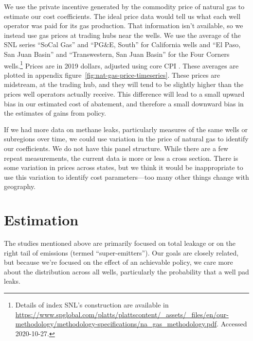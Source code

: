 \documentclass[12pt,oneside,letterpaper]{article}
\theoremstyle{definition}
\begin{document}
\begin{refsection}
We use the private incentive generated by the commodity price of natural gas to estimate our cost coefficients.
The ideal price data would tell us what each well operator was paid for its gas production.
That information isn't available, so we instead use gas prices at trading hubs near the wells.
We use the average of the \gls{SNL} series ``SoCal Gas'' and ``PG\&E, South'' for California wells and
``El Paso, San Juan Basin'' and ``Transwestern, San Juan Basin'' for the Four Corners wells.\footnote{%
Details of index SNL's construction are available in \url{https://www.spglobal.com/platts/plattscontent/_assets/_files/en/our-methodology/methodology-specifications/na_gas_methodology.pdf}.
Accessed 2020-10-27.}
Prices are in 2019 dollars, adjusted using core CPI \parencite{fred_cpi}.
These averages are plotted in appendix figure~\ref{fig:nat-gas-price-timeseries}.
These prices are midstream, at the trading hub, and they will tend to be slightly higher than the prices well operators actually receive.
This difference will lead to a small upward bias in our estimated cost of abatement, and therefore a small downward bias in the estimates of gains from policy.

If we had more data on methane leaks, particularly measures of the same wells or subregions over time, we could use variation in the price of natural gas to identify our coefficients.
We do not have this panel structure.
While there are a few repeat measurements, the current data is more or less a cross section.
There is some variation in prices across states, but we think it would be inappropriate to use this variation to identify cost parameters---too many other things change with geography.


\section{Estimation}
\label{sec:estimation}



The studies mentioned above are primarily focused on total leakage or on the  right tail of emissions (termed ``super-emitters'').
Our goals are closely related, but because we're focused on the effect of an achievable policy, we care more about the distribution across all wells, particularly the probability that a well pad leaks.



\end{refsection}
\end{document}
